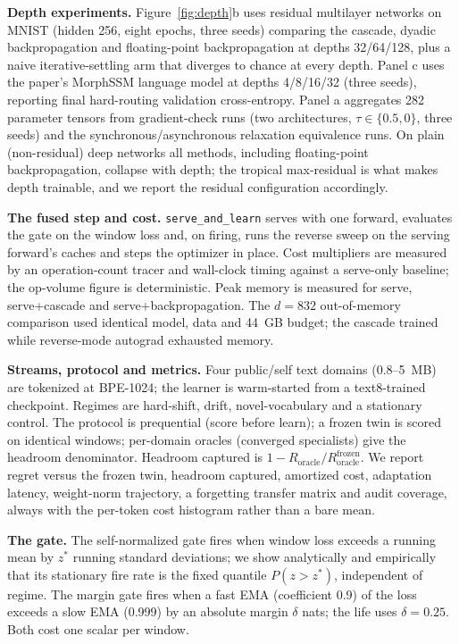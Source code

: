 \documentclass[11pt]{article}
\newcommand{\heading}[1]{\vspace{4pt}\noindent\textbf{#1}\hspace{0.6em}}
\begin{document}
\heading{Depth experiments.}
Figure~\ref{fig:depth}b uses residual multilayer networks on MNIST (hidden 256,
eight epochs, three seeds) comparing the cascade, dyadic backpropagation and
floating-point backpropagation at depths 32/64/128, plus a naive
iterative-settling arm that diverges to chance at every depth. Panel c uses the
paper's MorphSSM language model at depths 4/8/16/32 (three seeds), reporting
final hard-routing validation cross-entropy. Panel a aggregates 282 parameter
tensors from gradient-check runs (two architectures, $\tau\in\{0.5,0\}$, three
seeds) and the synchronous/asynchronous relaxation equivalence runs. On plain
(non-residual) deep networks all methods, including floating-point
backpropagation, collapse with depth; the tropical max-residual is what makes
depth trainable, and we report the residual configuration accordingly.

\heading{The fused step and cost.}
\texttt{serve\_and\_learn} serves with one forward, evaluates the gate on the
window loss and, on firing, runs the reverse sweep on the serving forward's
caches and steps the optimizer in place. Cost multipliers are measured by an
operation-count tracer and wall-clock timing against a serve-only baseline; the
op-volume figure is deterministic. Peak memory is measured for serve,
serve+cascade and serve+backpropagation. The $d{=}832$ out-of-memory comparison
used identical model, data and 44~GB budget; the cascade trained while
reverse-mode autograd exhausted memory.

\heading{Streams, protocol and metrics.}
Four public/self text domains (0.8--5~MB) are tokenized at BPE-1024; the learner
is warm-started from a text8-trained checkpoint. Regimes are hard-shift, drift,
novel-vocabulary and a stationary control. The protocol is prequential (score
before learn); a frozen twin is scored on identical windows; per-domain oracles
(converged specialists) give the headroom denominator. Headroom captured is
$1-R_{\mathrm{oracle}}/R^{\mathrm{frozen}}_{\mathrm{oracle}}$. We report regret
versus the frozen twin, headroom captured, amortized cost, adaptation latency,
weight-norm trajectory, a forgetting transfer matrix and audit coverage, always
with the per-token cost histogram rather than a bare mean.

\heading{The gate.}
The self-normalized gate fires when window loss exceeds a running mean by
$z^{*}$ running standard deviations; we show analytically and empirically that
its stationary fire rate is the fixed quantile $P(z>z^{*})$, independent of
regime. The margin gate fires when a fast EMA (coefficient 0.9) of the loss
exceeds a slow EMA (0.999) by an absolute margin $\delta$ nats; the life uses
$\delta{=}0.25$. Both cost one scalar per window.
\end{document}
